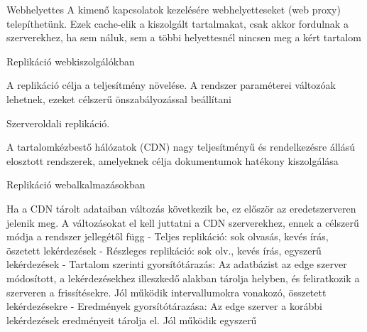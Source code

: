 \documentclass[12pt]{article}
\begin{document}
\begin{description}
                                                                    \item  Webhelyettes
                                                                        A kimenő kapcsolatok kezelésére webhelyetteseket (web proxy) telepíthetünk. Ezek cache-elik a kiszolgált tartalmakat,
                                                                        csak akkor fordulnak a szerverekhez, ha sem náluk, sem a többi helyettesnél nincsen meg a kért tartalom
                                                                    \item  Replikáció webkiszolgálókban
                                                                    \item A replikáció célja a teljesítmény növelése. A rendszer paraméterei változóak lehetnek, ezeket célszerű önszabályozással beállítani
                                                                    \item  Szerveroldali replikáció.
                                                                    \item A tartalomkézbestő hálózatok (CDN) nagy teljesítményű és rendelkezésre állású elosztott rendszerek, amelyeknek célja
                                                                        dokumentumok hatékony kiszolgálása
                                                                    \item  Replikáció webalkalmazásokban
                                                                    \item Ha a CDN tárolt adataiban változás következik be, ez először az eredetszerveren jelenik meg. A változásokat el kell juttatni
                                                                        a CDN szerverekhez, ennek a célszerű módja a rendszer jellegétől függ
                                                                        - Teljes replikáció: sok olvasás, kevés írás, öszetett lekérdezések
                                                                        - Részleges replikáció: sok olv., kevés írás, egyszerű lekérdezések
                                                                        - Tartalom szerinti gyorsítótárazás: Az adatbázist az edge szerver módosított, a lekérdezésekhez illeszkedő alakban
                                                                        tárolja helyben, és feliratkozik a szerveren a frissítésekre. Jól működik intervallumokra vonakozó, összetett lekérdezésekre
                                                                        - Eredmények gyorsítótárazása: Az edge szerver a korábbi lekérdezések eredményeit tárolja el. Jól működik egyszerű

\end{description}
\end{document}
